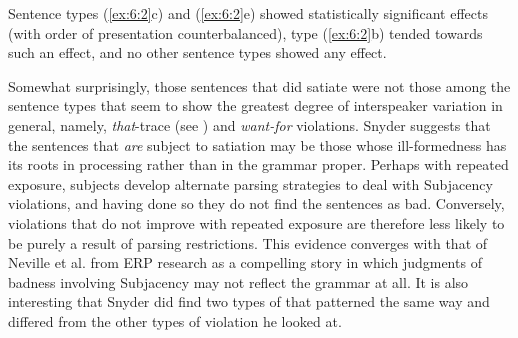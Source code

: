  \noindent
Sentence types (\ref{ex:6:2}c) and (\ref{ex:6:2}e) showed statistically significant  effects (with order of presentation counterbalanced), type (\ref{ex:6:2}b) tended towards such an effect, and no other sentence types showed any effect.

 Somewhat surprisingly, those sentences that did satiate were not those among the sentence types that seem to show the greatest degree of interspeaker variation in general, namely, \textit{that}-trace (see ) and \textit{want-for} violations. Snyder suggests that the sentences that \textit{are} subject to satiation may be those whose ill-formedness has its roots in processing rather than in the grammar proper. Perhaps with repeated exposure, subjects develop alternate parsing strategies to deal with Subjacency violations, and having done so they do not find the sentences as bad. Conversely, violations that do not improve with repeated exposure are therefore less likely to be purely a result of parsing restrictions. This evidence converges with that of Neville et al. from ERP research as a compelling story in which judgments of badness involving Subjacency may not reflect the grammar at all. It is also interesting that Snyder did find two types of  that patterned the same way and differed from the other types of violation he looked at.

